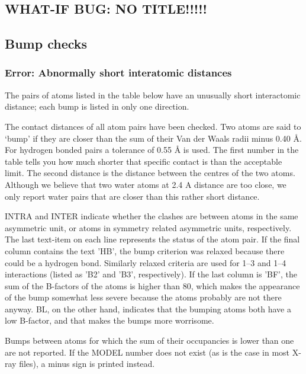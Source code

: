 \documentclass[a4paper]{article}
\def\showsect#1{
  \thesect\gdef\thesect{}
  \thessect\gdef\thessect{}
  \subsubsection{#1}
}
\def\ssect#1{
  \gdef\thessect{\subsection{#1}}
}
\gdef\thesect{\pagebreak[2]\section{WHAT-IF BUG: NO TITLE!!!!!}}
\gdef\thessect{\subsection{General}}
\begin{document}
\ssect{Bump checks}
\begin{error}
\showsect{Error: Abnormally short interatomic distances}
The pairs of atoms listed in the table below have an unusually short
interactomic distance; each bump is listed in only one direction.
 
The contact distances of all atom pairs have been checked. Two atoms are
said to `bump' if they are closer than the sum of their Van der Waals radii
minus 0.40 {\AA}. For hydrogen bonded pairs a tolerance of 0.55 {\AA}
is used. The first number in the table tells you how much shorter that
specific contact is than the acceptable limit. The second distance is the
distance between the centres of the two atoms. Although we believe that two
water atoms at 2.4 A distance are too close, we only report water pairs that
are closer than this rather short distance.
 
INTRA and INTER indicate whether the clashes are between atoms in the same
asymmetric unit, or atoms in symmetry related asymmetric units, respectively.
The last text-item on each line represents the status of the atom pair. If
the final column contains the text 'HB', the bump criterion was relaxed
because there could be a hydrogen bond. Similarly relaxed criteria are used
for 1--3 and 1--4 interactions (listed as 'B2' and 'B3', respectively).
If the last column is 'BF', the sum of the B-factors of the atoms is higher
than 80, which makes the appearance of the bump somewhat less severe because
the atoms probably are not there anyway. BL, on the other hand, indicates
that the bumping atoms both have a low B-factor, and that makes the bumps
more worrisome.
 
Bumps between atoms for which the sum of their occupancies is lower than one
are not reported. If the MODEL number does not exist (as is the case in most
X-ray files), a minus sign is printed instead.
 
\begin{center}
 

\end{center}
\end{error}
\end{document}
